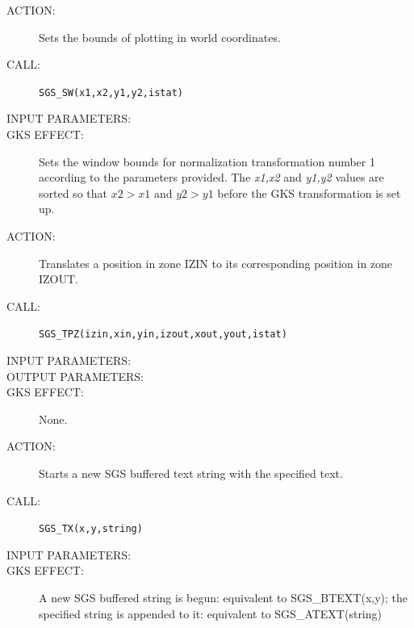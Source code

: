 \documentclass[11pt]{article}
\newcommand{\htmlref}[2]{#1}
\begin{document}
\begin{description}
\item [ACTION:]
Sets the bounds of plotting in world coordinates.
\item [CALL:]
{\tt SGS\_SW(x1,x2,y1,y2,istat)}
\item [INPUT PARAMETERS:]
\begin{params}
\end{params}
\item [GKS EFFECT:]
Sets the window bounds for normalization transformation number 1 according to
the parameters provided.
The {\it x1,x2} and {\it y1,y2} values are sorted so that $\mathit{x2}>
\mathit{x1}$ and $\mathit{y2}>\mathit{y1}$ before the GKS transformation is set up.
\end{description}
\goodbreak

\begin{description}
\item [ACTION:]
Translates a position in zone IZIN to its corresponding position in zone IZOUT.
\item [CALL:]
{\tt SGS\_TPZ(izin,xin,yin,izout,xout,yout,istat)}
\item [INPUT PARAMETERS:]
\begin{params}
\end{params}
\item [OUTPUT PARAMETERS:]
\begin{params}
\end{params}
\item [GKS EFFECT:]
None.
\end{description}
\goodbreak

\begin{description}
\item [ACTION:]
Starts a new SGS buffered text string with the specified text.
\item [CALL:]
{\tt SGS\_TX(x,y,string)}
\item [INPUT PARAMETERS:]
\begin{params}
\end{params}
\item [GKS EFFECT:]
A new SGS buffered string is begun: equivalent to 
\htmlref{SGS\_BTEXT}{SGS_BTEXT}(x,y); the
specified string is appended to it: equivalent to 
\htmlref{SGS\_ATEXT}{SGS_ATEXT}(string)
\end{description}
\goodbreak
\end{document}
